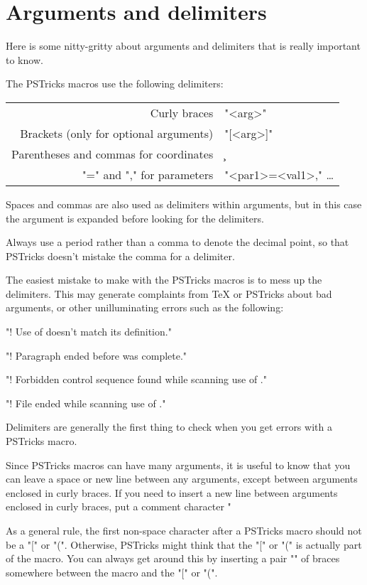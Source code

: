 \section{Arguments and delimiters}

Here is some nitty-gritty about arguments and delimiters that is really
important to know.

The PSTricks macros use the following delimiters:
\begin{center}
\begin{tabular}{rl}
Curly braces & "{<arg>}" \\
Brackets (only for optional arguments) & "[<arg>]" \\
Parentheses and commas for coordinates & \c{} \\
"=" and "," for parameters & "<par1>=<val1>," \ldots\\
\end{tabular}
\end{center}
Spaces and commas are also used as delimiters within arguments, but in this
case the argument is expanded before looking for the delimiters.

Always use a period rather than a comma to denote the decimal point, so that
PSTricks doesn't mistake the comma for a delimiter.

The easiest mistake to make with the PSTricks macros is to mess up the
delimiters. This may generate complaints from \TeX{} or PSTricks about bad
arguments, or other unilluminating errors such as the following:
\begin{description}\itemsep=0pt\parsep=0pt
\item[] "! Use of \get@coor doesn't match its definition."
\item[] "! Paragraph ended before \pst@addcoor was complete."
\item[]
"! Forbidden control sequence found while scanning use of \check@arrow."
\item[] "! File ended while scanning use of \lput."
\end{description}
Delimiters are generally the first thing to check when you get errors with a
PSTricks macro.

Since PSTricks macros can have many arguments, it is useful to know that you
can leave a space or new line between any arguments, except between arguments
enclosed in curly braces. If you need to insert a new line between arguments
enclosed in curly braces, put a comment character "%

As a general rule, the first non-space character after a PSTricks macro should
not be a "[" or "(". Otherwise, PSTricks might think that the "[" or "(" is
actually part of the macro. You can always get around this by inserting a pair
"{}" of braces somewhere between the macro and the "[" or "(".



